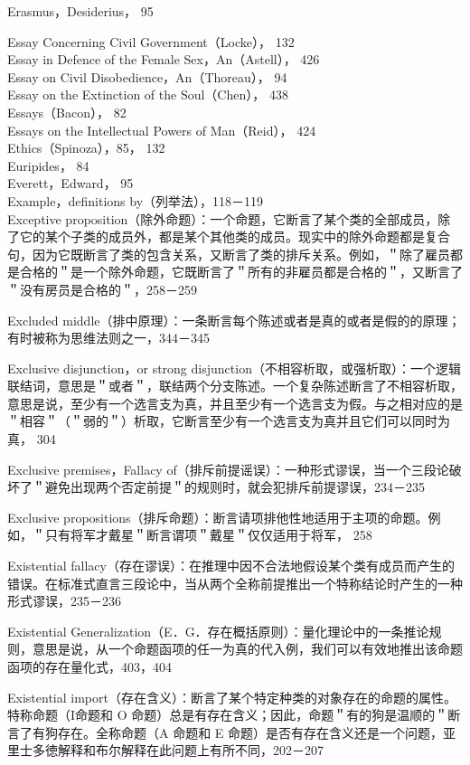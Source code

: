 Erasmus，Desiderius， 95

Essay Concerning Civil Government（Locke）， 132\\
Essay in Defence of the Female Sex，An（Astell）， 426\\
Essay on Civil Disobedience，An（Thoreau）， 94\\
Essay on the Extinction of the Soul（Chen）， 438\\
Essays（Bacon）， 82\\
Essays on the Intellectual Powers of Man（Reid）， 424\\
Ethics（Spinoza），85， 132\\
Euripides， 84\\
Everett，Edward， 95\\
Example，definitions by（列举法），118－119\\
Exceptive proposition（除外命题）：一个命题，它断言了某个类的全部成员，除了它的某个子类的成员外，都是某个其他类的成员。现实中的除外命题都是复合句，因为它既断言了类的包含关系，又断言了类的排斥关系。例如，＂除了雇员都是合格的＂是一个除外命题，它既断言了＂所有的非雇员都是合格的＂，又断言了＂没有房员是合格的＂，258－259

Excluded middle（排中原理）：一条断言每个陈述或者是真的或者是假的的原理；有时被称为思维法则之一，344－345

Exclusive disjunction，or strong disjunction（不相容析取，或强析取）：一个逻辑联结词，意思是＂或者＂，联结两个分支陈述。一个复杂陈述断言了不相容析取，意思是说，至少有一个选言支为真，并且至少有一个选言支为假。与之相对应的是＂相容＂（＂弱的＂）析取，它断言至少有一个选言支为真并且它们可以同时为真， 304

Exclusive premises，Fallacy of（排斥前提谣误）：一种形式谬误，当一个三段论破坏了＂避免出现两个否定前提＂的规则时，就会犯排斥前提谬误，234－235

Exclusive propositions（排斥命题）：断言请项排他性地适用于主项的命题。例如，＂只有将军才戴星＂断言谓项＂戴星＂仅仅适用于将军， 258

Existential fallacy（存在谬误）：在推理中因不合法地假设某个类有成员而产生的错误。在标准式直言三段论中，当从两个全称前提推出一个特称结论时产生的一种形式谬误，235－236

Existential Generalization（E．G．存在概括原则）：量化理论中的一条推论规则，意思是说，从一个命题函项的任一为真的代入例，我们可以有效地推出该命题函项的存在量化式，403，404

Existential import（存在含义）：断言了某个特定种类的对象存在的命题的属性。特称命题（I命题和 O 命题）总是有存在含义；因此，命题＂有的狗是温顺的＂断言了有狗存在。全称命题（A 命题和 E 命题）是否有存在含义还是一个问题，亚里士多徳解释和布尔解释在此问题上有所不同，202－207

